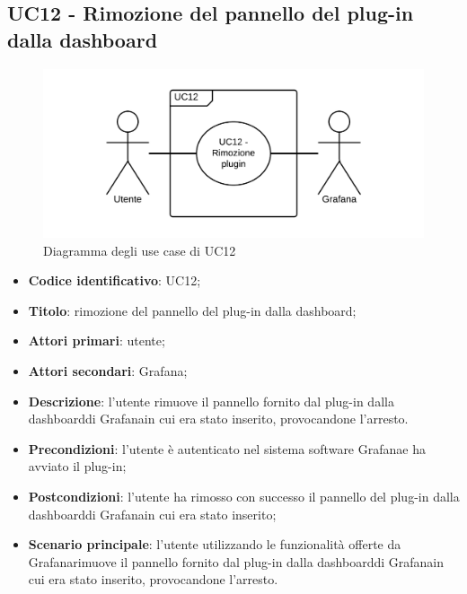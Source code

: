 \subsection{UC12 - Rimozione del pannello del plug-in dalla dashboard}
\begin{figure}[H]
\includegraphics{img/UC12_-_Rimozione_plugin.png}
\caption{Diagramma degli use case di UC12}
\end{figure}
\begin{itemize}
    \item \textbf{Codice identificativo}: UC12;
    \item \textbf{Titolo}: rimozione del pannello del plug-in dalla dashboard\glo;
    \item \textbf{Attori primari}: utente;
    \item \textbf{Attori secondari}: Grafana\glo;
    \item \textbf{Descrizione}: l'utente rimuove il pannello fornito dal plug-in dalla dashboard\glosp di Grafana\glosp in cui era stato inserito, provocandone l'arresto.
    \item \textbf{Precondizioni}: l'utente è autenticato nel sistema software Grafana\glosp e ha avviato il plug-in;
    \item \textbf{Postcondizioni}: l'utente ha rimosso con successo il pannello del plug-in dalla dashboard\glosp di Grafana\glo in cui era stato inserito;
    \item \textbf{Scenario principale}: l'utente utilizzando le funzionalità offerte da Grafana\glosp rimuove il pannello fornito dal plug-in dalla dashboard\glosp di Grafana\glosp in cui era stato inserito, provocandone l'arresto.
\end{itemize}

